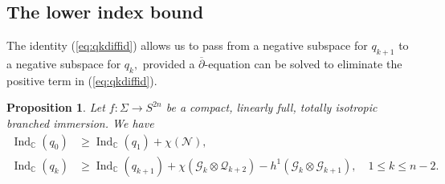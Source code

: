 \documentclass[11pt]{article}
\newtheorem{prop}[theorem]{Proposition}
\theoremstyle{definition}
\newcommand{\C}{\mathbb{C}}
\newcommand{\delbar}{\overline{\partial}}
\numberwithin{equation}{section}
\begin{document}
\subsection{The lower index bound}

\indent \indent The identity (\ref{eq:qkdiffid}) allows us to pass from a negative subspace for $q_{k+1}$ to a negative subspace for $q_{k},$ provided a $\delbar$-equation can be solved to eliminate the positive term in (\ref{eq:qkdiffid}). \newpage

\begin{prop}\label{prop:inductivestep}	
    Let $f: \Sigma \to S^{2n}$ be a compact, linearly full, totally isotropic branched immersion. We have
	\begin{equation*}
		\begin{aligned}
			\operatorname{Ind}_\C(q_0) & \geq \operatorname{Ind}_\C(q_{1}) + \chi(\mathcal{N}), \\
			\operatorname{Ind}_\C(q_k) & \geq \operatorname{Ind}_\C(q_{k+1}) + \chi(\mathcal G_k \otimes \mathcal{Q}_{k+2}) - h^1(\mathcal{G}_k \otimes \mathcal{G}_{k+1}), \quad 1 \leq k \leq n-2. 
		\end{aligned}
	\end{equation*}
\end{prop}
\end{document}
